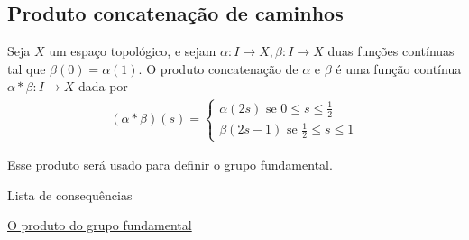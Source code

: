 \subsection{Produto concatenação de caminhos}
\label{Produto-concatenacao-def}
\begin{defi}
	Seja $X$ um espaço topológico, e sejam $\alpha:I\rightarrow X, \beta:I\rightarrow X$ duas funções contínuas tal que $\beta(0)=\alpha(1).$ O produto concatenação de $\alpha$ e $\beta$ é uma função contínua $\alpha*\beta:I\rightarrow X$ dada por 
 \begin{align*}
     (\alpha*\beta)(s)=\begin{cases}
         \alpha(2s)\mbox{ se }0\le s\le\frac{1}{2}\\
         \beta(2s-1)\mbox{ se }\frac{1}{2}\le s \le 1
     \end{cases}
 \end{align*}
\end{defi}

Esse produto será usado para definir o grupo fundamental.

\begin{titlemize}{Lista de consequências}
	\item \hyperref[produto-bem-definido-prop]{O produto do grupo fundamental}
\end{titlemize}

